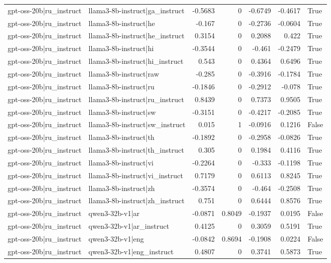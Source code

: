\begin{table}
\begin{tabular}{l l r r r r l}
gpt-oss-20b|ru_instruct & llama3-8b-instruct|ga_instruct & -0.5683 & 0 & -0.6749 & -0.4617 & True \\
gpt-oss-20b|ru_instruct & llama3-8b-instruct|he & -0.167 & 0 & -0.2736 & -0.0604 & True \\
gpt-oss-20b|ru_instruct & llama3-8b-instruct|he_instruct & 0.3154 & 0 & 0.2088 & 0.422 & True \\
gpt-oss-20b|ru_instruct & llama3-8b-instruct|hi & -0.3544 & 0 & -0.461 & -0.2479 & True \\
gpt-oss-20b|ru_instruct & llama3-8b-instruct|hi_instruct & 0.543 & 0 & 0.4364 & 0.6496 & True \\
gpt-oss-20b|ru_instruct & llama3-8b-instruct|raw & -0.285 & 0 & -0.3916 & -0.1784 & True \\
gpt-oss-20b|ru_instruct & llama3-8b-instruct|ru & -0.1846 & 0 & -0.2912 & -0.078 & True \\
gpt-oss-20b|ru_instruct & llama3-8b-instruct|ru_instruct & 0.8439 & 0 & 0.7373 & 0.9505 & True \\
gpt-oss-20b|ru_instruct & llama3-8b-instruct|sw & -0.3151 & 0 & -0.4217 & -0.2085 & True \\
gpt-oss-20b|ru_instruct & llama3-8b-instruct|sw_instruct & 0.015 & 1 & -0.0916 & 0.1216 & False \\
gpt-oss-20b|ru_instruct & llama3-8b-instruct|th & -0.1892 & 0 & -0.2958 & -0.0826 & True \\
gpt-oss-20b|ru_instruct & llama3-8b-instruct|th_instruct & 0.305 & 0 & 0.1984 & 0.4116 & True \\
gpt-oss-20b|ru_instruct & llama3-8b-instruct|vi & -0.2264 & 0 & -0.333 & -0.1198 & True \\
gpt-oss-20b|ru_instruct & llama3-8b-instruct|vi_instruct & 0.7179 & 0 & 0.6113 & 0.8245 & True \\
gpt-oss-20b|ru_instruct & llama3-8b-instruct|zh & -0.3574 & 0 & -0.464 & -0.2508 & True \\
gpt-oss-20b|ru_instruct & llama3-8b-instruct|zh_instruct & 0.751 & 0 & 0.6444 & 0.8576 & True \\
gpt-oss-20b|ru_instruct & qwen3-32b-v1|ar & -0.0871 & 0.8049 & -0.1937 & 0.0195 & False \\
gpt-oss-20b|ru_instruct & qwen3-32b-v1|ar_instruct & 0.4125 & 0 & 0.3059 & 0.5191 & True \\
gpt-oss-20b|ru_instruct & qwen3-32b-v1|eng & -0.0842 & 0.8694 & -0.1908 & 0.0224 & False \\
gpt-oss-20b|ru_instruct & qwen3-32b-v1|eng_instruct & 0.4807 & 0 & 0.3741 & 0.5873 & True \\

\end{tabular}
\end{table}
